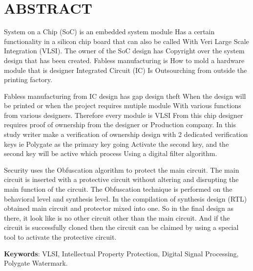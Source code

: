 \chapter*{ABSTRACT}

\noindent System on a Chip (SoC) is an embedded system module
Has a certain functionality in a silicon chip board that can also be called
With Veri Large Scale Integration (VLSI). The owner of the SoC design has
Copyright over the system design that has been created. Fabless manufacturing is
How to mold a hardware module that is designer Integrated Circuit (IC)
Is Outsourching from outside the printing factory.

\vspace*{0.5cm}
\noindent Fabless manufacturing from IC design has gap design theft
When the design will be printed or when the project requires mutiple module
With various functions from various designers. Therefore every module is VLSI
From this chip designer requires proof of ownership from the designer or
Production company. In this study writer make a verification of ownership design
with 2 dedicated verification keys ie Polygate as the primary key going
Activate the second key, and the second key will be active which process
Using a digital filter algorithm.

\vspace*{0.5cm}
\noindent Security uses the Obfuscation algorithm to protect the main circuit. The main circuit is inserted with a protective circuit without altering and disrupting the main function of the circuit. The Obfuscation technique is performed on the behavioral level and synthesis level. In the compilation of synthesis design (RTL) obtained main circuit and protector mixed into one. So in the final design as there, it look like is no other circuit other than the main circuit. And if the circuit is successfully cloned then the circuit can be claimed by using a special tool to activate the protective circuit.

\vspace*{0.5cm}

\noindent \textbf{Keywords}: VLSI, Intellectual Property Protection, Digital Signal Processing, Polygate Watermark.

\newpage